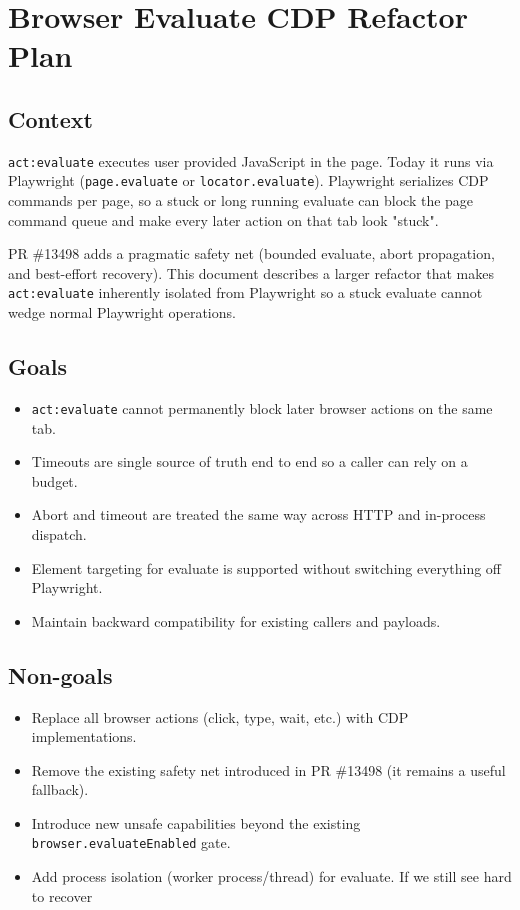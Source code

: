 \clearpage

\section{Browser Evaluate CDP Refactor Plan}


\subsection{Context}


\texttt{act:evaluate} executes user provided JavaScript in the page. Today it runs via Playwright
(\texttt{page.evaluate} or \texttt{locator.evaluate}). Playwright serializes CDP commands per page, so a
stuck or long running evaluate can block the page command queue and make every later action
on that tab look "stuck".

PR \#13498 adds a pragmatic safety net (bounded evaluate, abort propagation, and best-effort
recovery). This document describes a larger refactor that makes \texttt{act:evaluate} inherently
isolated from Playwright so a stuck evaluate cannot wedge normal Playwright operations.

\subsection{Goals}


\begin{itemize}
  \item \texttt{act:evaluate} cannot permanently block later browser actions on the same tab.
  \item Timeouts are single source of truth end to end so a caller can rely on a budget.
  \item Abort and timeout are treated the same way across HTTP and in-process dispatch.
  \item Element targeting for evaluate is supported without switching everything off Playwright.
  \item Maintain backward compatibility for existing callers and payloads.
\end{itemize}


\subsection{Non-goals}


\begin{itemize}
  \item Replace all browser actions (click, type, wait, etc.) with CDP implementations.
  \item Remove the existing safety net introduced in PR \#13498 (it remains a useful fallback).
  \item Introduce new unsafe capabilities beyond the existing \texttt{browser.evaluateEnabled} gate.
  \item Add process isolation (worker process/thread) for evaluate. If we still see hard to recover
\end{itemize}


